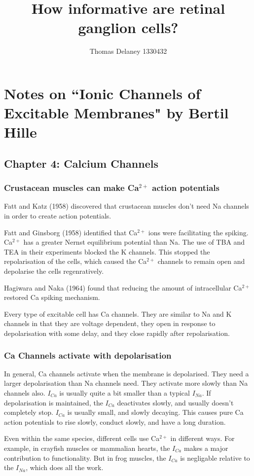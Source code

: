 \documentclass[a4paper,12pt]{article}
\title{How informative are retinal ganglion cells?}
\author{Thomas Delaney 1330432}
\theoremstyle{definition}
\begin{document}
\section{Notes on ``Ionic Channels of Excitable Membranes" by Bertil Hille}
\subsection{Chapter 4: Calcium Channels}
\subsubsection{Crustacean muscles can make Ca$^{2+}$ action potentials}
	Fatt and Katz (1958) discovered that crustacean muscles don't need Na channels in order to create action potentials.
	
	Fatt and Ginsborg (1958) identified that Ca$^{2+}$ ions were facilitating the spiking. Ca$^{2+}$ has a greater Nernst equilibrium potential than Na. The use of TBA and TEA in their experiments blocked the K channels. This stopped the repolarisation of the cells, which caused the Ca$^{2+}$ channels to remain open and depolarise the cells regenratively.
	
	Hagiwara and Naka (1964) found that reducing the amount of intracellular Ca$^{2+}$ restored Ca spiking mechanism.
	
	Every type of excitable cell has Ca channels. They are similar to Na and K channels in that they are voltage dependent, they open in response to depolarisation with some delay, and they close rapidly after repolarisation.
	
\subsubsection{Ca Channels activate with depolarisation}
	In general, Ca channels activate when the membrane is depolarised. They need a larger depolarisation than Na channels need. They activate more slowly than Na channels also. $I_{Ca}$ is usually quite a bit smaller than a typical $I_{Na}$. If depolarisation is maintained, the $I_{Ca}$ deactivates slowly, and usually doesn't completely stop. $I_{Ca}$ is usually small, and slowly decaying. This causes pure Ca action potentials to rise slowly, conduct slowly, and have a long duration.
	
	Even within the same species, different cells use Ca$^{2+}$ in different ways. For example, in crayfish muscles or mammalian hearts, the $I_{Ca}$ makes a major contribution to functionality. But in frog muscles, the $I_{Ca}$ is negligable relative to the $I_{Na}$, which does all the work.
\end{document}
